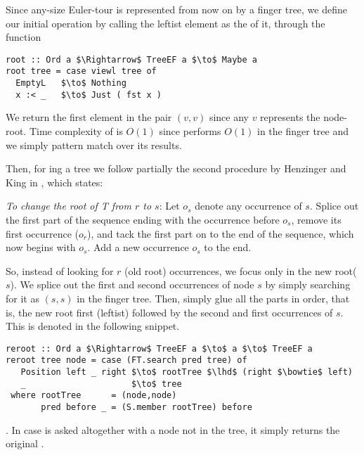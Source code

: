 Since any-size Euler-tour is represented from now on by a finger tree, we define our initial operation by calling the leftist element as the \root of it, through the function 
\begin{lstlisting}[mathescape] 
root :: Ord a $\Rightarrow$ TreeEF a $\to$ Maybe a  
root tree = case viewl tree of
  EmptyL   $\to$ Nothing
  x :< _   $\to$ Just ( fst x )
\end{lstlisting}

We return the first element in the pair $(v,v)$ since any $v$ represents the node-root. Time complexity of \root is $O(1)$ since  performs $O(1)$ in the finger tree and we simply pattern match over its results.

Then, for ing a tree we follow partially the second procedure by Henzinger and King in \cite{Rand-DynGs-Algos}, which states:
\begin{displayquote}
\emph{To change the root of \textit{T} from $r$ to $s$}: Let $o_s$ denote any occurrence of $s$. Splice out the first part of the sequence ending with the occurrence before $o_s$, remove its first occurrence ($o_r$), and tack the first part on to the end of the sequence, which now begins with $o_s$. Add a new occurrence $o_s$ to the end.
\end{displayquote}

So, instead of looking for $r$ (old root) occurrences, we focus only in the new root($s$). We splice out the first and second occurrences of node $s$ by simply searching for it as $(s,s)$ in the finger tree. Then, simply glue all the parts in order, that is, the new root first (leftist) followed by the second and first occurrences of $s$. This is denoted in the following snippet.

\begin{lstlisting}[mathescape]
reroot :: Ord a $\Rightarrow$ TreeEF a $\to$ a $\to$ TreeEF a 
reroot tree node = case (FT.search pred tree) of
   Position left _ right $\to$ rootTree $\lhd$ (right $\bowtie$ left)
   _                     $\to$ tree
 where rootTree      = (node,node)
       pred before _ = (S.member rootTree) before
\end{lstlisting} 

. In case  is asked altogether with a node not in the tree, it simply returns the original .

